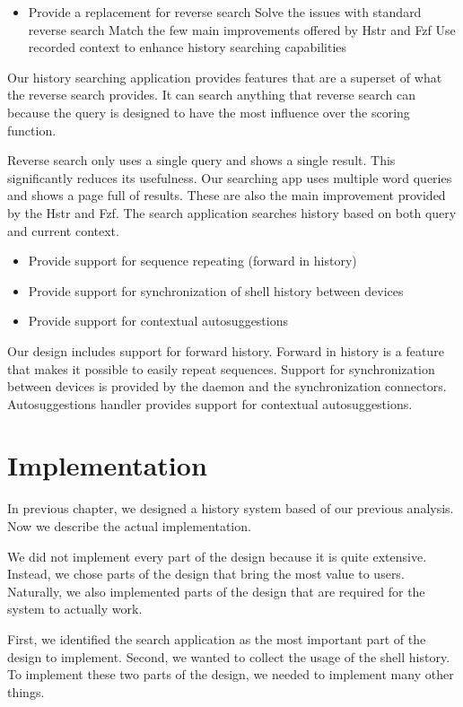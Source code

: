 \documentclass[thesis=M,english]{FITthesis}[2012/10/20]
\begin{document}
\begin{itemize}
    \item Provide a replacement for reverse search
    \subitem Solve the issues with standard reverse search
    \subitem Match the few main improvements offered by Hstr and Fzf
    \subitem Use recorded context to enhance history searching capabilities
\end{itemize}
Our history searching application provides features that are a superset of what the reverse search provides. It can search anything that reverse search can because the query is designed to have the most influence over the scoring function.

Reverse search only uses a single query and shows a single result. This significantly reduces its usefulness. Our searching app uses multiple word queries and shows a page full of results. These are also the main improvement provided by the Hstr and Fzf.
The search application searches history based on both query and current context.

\begin{itemize}
    \item Provide support for sequence repeating (forward in history)
    \item Provide support for synchronization of shell history between devices
    \item Provide support for contextual autosuggestions
\end{itemize}
Our design includes support for forward history. Forward in history is a feature that makes it possible to easily repeat sequences. 
Support for synchronization between devices is provided by the daemon and the synchronization connectors. Autosuggestions handler provides support for contextual autosuggestions.
 

\chapter{Implementation}

In previous chapter, we designed a history system based of our previous analysis. Now we describe the actual implementation. 

We did not implement every part of the design because it is quite extensive. Instead, we chose parts of the design that bring the most value to users. Naturally, we also implemented parts of the design that are required for the system to actually work.

First, we identified the search application as the most important part of the design to implement. Second, we wanted to collect the usage of the shell history. To implement these two parts of the design, we needed to implement many other things. 
\end{document}
